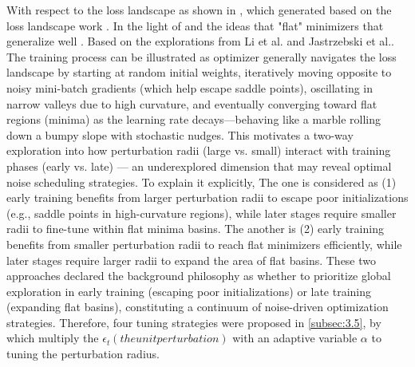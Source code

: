 \documentclass[10pt,twocolumn,letterpaper]{article}
\begin{document}
With respect to the loss landscape as shown in , which generated based on the loss landscape work \cite{li2018visualizinglosslandscapeneural}. 
In the light of  and the ideas that "flat" minimizers that generalize well \cite{chaudhari2017entropysgdbiasinggradientdescent}. Based on the explorations from Li et al.\cite{li2018visualizinglosslandscapeneural} and Jastrzebski et al.\cite{jastrzebski2020breakevenpointoptimizationtrajectories}. The training process can be illustrated as optimizer generally navigates the loss landscape by starting at random initial weights, iteratively moving opposite to noisy mini-batch gradients (which help escape saddle points), oscillating in narrow valleys due to high curvature, and eventually converging toward flat regions (minima) as the learning rate decays—behaving like a marble rolling down a bumpy slope with stochastic nudges. 
This motivates a two-way exploration into how perturbation radii (large vs. small) interact with training phases (early vs. late) — an underexplored dimension that may reveal optimal noise scheduling strategies. To explain it explicitly, The one is considered as (1) early training benefits from larger perturbation radii to escape poor initializations (e.g., saddle points in high-curvature regions), while later stages require smaller radii to fine-tune within flat minima basins. The another is (2) early training benefits from smaller perturbation radii to reach flat minimizers efficiently, while later stages require larger radii to expand the area of flat basins. These two approaches declared the background philosophy as whether to prioritize global exploration in early training (escaping poor initializations) or late training (expanding flat basins), constituting a continuum of noise-driven optimization strategies. Therefore, four tuning strategies were proposed in \ref{subsec:3.5}, by which multiply the $\epsilon_{t} (the unit perturbation)$ with an adaptive variable $\alpha$ to tuning the perturbation radius.
\end{document}
